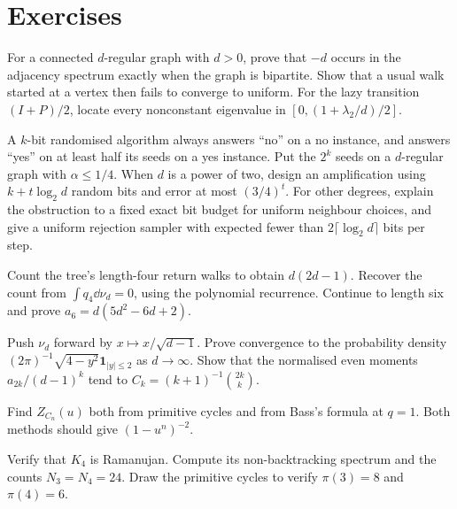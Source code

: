 \section{Exercises}

\begin{exercise}[$\star$]\label{ex:bipartiteeig}
For a connected $d$-regular graph with $d>0$, prove that $-d$ occurs in the adjacency spectrum exactly when the graph is bipartite. Show that a usual walk started at a vertex then fails to converge to uniform. For the lazy transition $(I+P)/2$, locate every nonconstant eigenvalue in $[0,(1+\lambda_2/d)/2]$.
\end{exercise}
\begin{exercise}[$\star\star$]\label{ex:amplify}
A $k$-bit randomised algorithm always answers ``no'' on a no instance, and answers ``yes'' on at least half its seeds on a yes instance. Put the $2^k$ seeds on a $d$-regular graph with $\alpha\le1/4$. When $d$ is a power of two, design an amplification using $k+t\log_2d$ random bits and error at most $(3/4)^t$. For other degrees, explain the obstruction to a fixed exact bit budget for uniform neighbour choices, and give a uniform rejection sampler with expected fewer than $2\lceil\log_2d\rceil$ bits per step.
\end{exercise}
\begin{exercise}[$\star$]\label{ex:treemoments}
Count the tree's length-four return walks to obtain $d(2d-1)$. Recover the count from $\int q_4\dd\nu_d=0$, using the polynomial recurrence. Continue to length six and prove $a_6=d(5d^2-6d+2)$.
\end{exercise}
\begin{exercise}[$\star\star$]\label{ex:kmsemicircle}
Push $\nu_d$ forward by $x\mapsto x/\sqrt{d-1}$. Prove convergence to the probability density $(2\pi)^{-1}\sqrt{4-y^2}\mathbf1_{|y|\le2}$ as $d\to\infty$. Show that the normalised even moments $a_{2k}/(d-1)^k$ tend to $C_k=(k+1)^{-1}\binom{2k}{k}$.
\end{exercise}
\begin{exercise}[$\star$]\label{ex:cycleihara}
Find $Z_{C_n}(u)$ both from primitive cycles and from Bass's formula at $q=1$. Both methods should give $(1-u^n)^{-2}$.
\end{exercise}
\begin{exercise}[$\star\star$]\label{ex:k4}
Verify that $K_4$ is Ramanujan. Compute its non-backtracking spectrum and the counts $N_3=N_4=24$. Draw the primitive cycles to verify $\pi(3)=8$ and $\pi(4)=6$.
\end{exercise}
